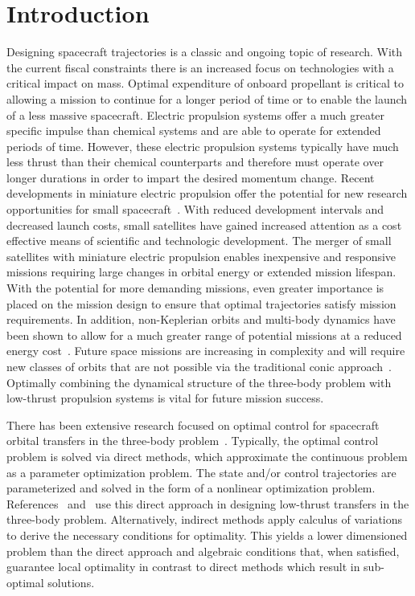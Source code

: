 \documentclass[letterpaper, paper,11pt]{AAS}		%
\begin{document}
\section{Introduction}\label{sec:introduction}
Designing spacecraft trajectories is a classic and ongoing topic of research.
With the current fiscal constraints there is an increased focus on technologies with a critical impact on mass.
Optimal expenditure of onboard propellant is critical to allowing a mission to continue for a longer period of time or to enable the launch of a less massive spacecraft.
Electric propulsion systems offer a much greater specific impulse than chemical systems and are able to operate for extended periods of time.
However, these electric propulsion systems typically have much less thrust than their chemical counterparts and therefore must operate over longer durations in order to impart the desired momentum change.
Recent developments in miniature electric propulsion offer the potential for new research opportunities for small spacecraft~\cite{haque2013}.
With reduced development intervals and decreased launch costs, small satellites have gained increased attention as a cost effective means of scientific and technologic development. 
The merger of small satellites with miniature electric propulsion enables inexpensive and responsive missions requiring large changes in orbital energy or extended mission lifespan.
With the potential for more demanding missions, even greater importance is placed on the mission design to ensure that optimal trajectories satisfy mission requirements. 
In addition, non-Keplerian orbits and multi-body dynamics have been shown to allow for a much greater range of potential missions at a reduced energy cost~\cite{koon2000}.
Future space missions are increasing in complexity and will require new classes of orbits that are not possible via the traditional conic approach~\cite{ross2006,gomez2001}.
Optimally combining the dynamical structure of the three-body problem with low-thrust propulsion systems is vital for future mission success.

There has been extensive research focused on optimal control for spacecraft orbital transfers in the three-body problem~\cite{mingotti2011,grebow2011}.
Typically, the optimal control problem is solved via direct methods, which approximate the continuous problem as a parameter optimization problem.
The state and/or control trajectories are parameterized and solved in the form of a nonlinear optimization problem.
References~ and~ use this direct approach in designing low-thrust transfers in the three-body problem.
Alternatively, indirect methods apply calculus of variations to derive the necessary conditions for optimality. 
This yields a lower dimensioned problem than the direct approach and algebraic conditions that, when satisfied, guarantee local optimality in contrast to direct methods which result in sub-optimal solutions.
\end{document}
